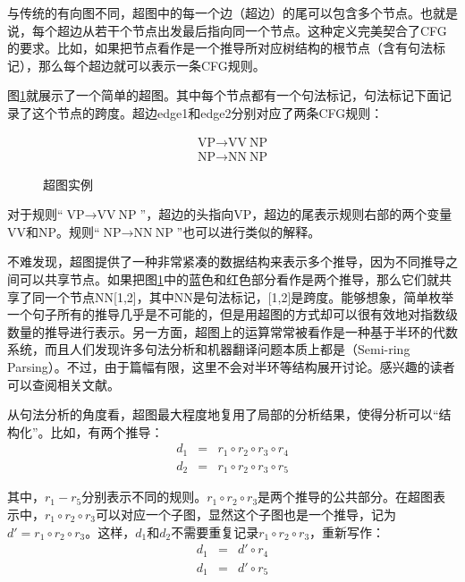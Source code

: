 \parinterval 与传统的有向图不同，超图中的每一个边（超边）的尾可以包含多个节点。也就是说，每个超边从若干个节点出发最后指向同一个节点。这种定义完美契合了CFG的要求。比如，如果把节点看作是一个推导所对应树结构的根节点（含有句法标记），那么每个超边就可以表示一条CFG规则。

\parinterval 图\ref{fig:8-37}就展示了一个简单的超图。其中每个节点都有一个句法标记，句法标记下面记录了这个节点的跨度。超边edge1和edge2分别对应了两条CFG规则：

\begin{eqnarray}
\textrm{VP} \rightarrow \textrm{VV}\ \textrm{NP} \nonumber \\
\textrm{NP} \rightarrow \textrm{NN}\ \textrm{NP} \nonumber
\end{eqnarray}

\begin{figure}[htp]
\centering

\caption{超图实例}
\label{fig:8-37}
\end{figure}

\parinterval 对于规则“$\textrm{VP} \rightarrow \textrm{VV}\ \textrm{NP}$”，超边的头指向VP，超边的尾表示规则右部的两个变量VV和NP。规则“$\textrm{NP} \rightarrow \textrm{NN}\ \textrm{NP}$”也可以进行类似的解释。

\parinterval 不难发现，超图提供了一种非常紧凑的数据结构来表示多个推导，因为不同推导之间可以共享节点。如果把图\ref{fig:8-37}中的蓝色和红色部分看作是两个推导，那么它们就共享了同一个节点NN[1,2]，其中NN是句法标记，[1,2]是跨度。能够想象，简单枚举一个句子所有的推导几乎是不可能的，但是用超图的方式却可以很有效地对指数级数量的推导进行表示。另一方面，超图上的运算常常被看作是一种基于半环的代数系统，而且人们发现许多句法分析和机器翻译问题本质上都是{\small{}}（Semi-ring Parsing）。不过，由于篇幅有限，这里不会对半环等结构展开讨论。感兴趣的读者可以查阅相关文献。

\parinterval 从句法分析的角度看，超图最大程度地复用了局部的分析结果，使得分析可以“结构化”。比如，有两个推导：
\begin{eqnarray}
d_1 & = & {r_1} \circ {r_2} \circ {r_3} \circ {r_4} \label{eqa4.30}\\
d_2 & = & {r_1} \circ {r_2} \circ {r_3} \circ {r_5}
\label{eq:8-10}
\end{eqnarray}

\noindent 其中，$r_1 - r_5$分别表示不同的规则。${r_1} \circ {r_2} \circ {r_3}$是两个推导的公共部分。在超图表示中，${r_1} \circ {r_2} \circ {r_3}$可以对应一个子图，显然这个子图也是一个推导，记为${d'}= {r_1} \circ {r_2} \circ {r_3}$。这样，$d_1$和$d_2$不需要重复记录${r_1} \circ {r_2} \circ {r_3}$，重新写作：
\begin{eqnarray}
d_1 & = & {d'} \circ {r_4} \label{eqa4.32}\\
d_1 & = & {d'} \circ {r_5}
\label{eq:8-12}
\end{eqnarray}

